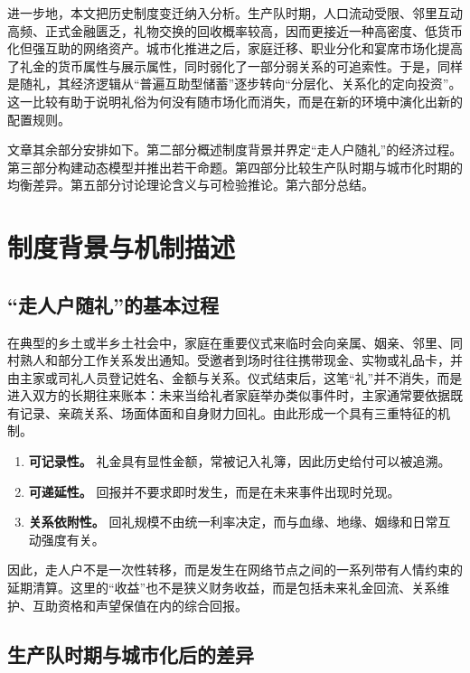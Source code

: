 \documentclass[12pt,a4paper]{ctexart}
\begin{document}
进一步地，本文把历史制度变迁纳入分析。生产队时期，人口流动受限、邻里互动高频、正式金融匮乏，礼物交换的回收概率较高，因而更接近一种高密度、低货币化但强互助的网络资产。城市化推进之后，家庭迁移、职业分化和宴席市场化提高了礼金的货币属性与展示属性，同时弱化了一部分弱关系的可追索性。于是，同样是随礼，其经济逻辑从“普遍互助型储蓄”逐步转向“分层化、关系化的定向投资”。这一比较有助于说明礼俗为何没有随市场化而消失，而是在新的环境中演化出新的配置规则。

文章其余部分安排如下。第二部分概述制度背景并界定“走人户随礼”的经济过程。第三部分构建动态模型并推出若干命题。第四部分比较生产队时期与城市化时期的均衡差异。第五部分讨论理论含义与可检验推论。第六部分总结。

\section{制度背景与机制描述}

\subsection{“走人户随礼”的基本过程}

在典型的乡土或半乡土社会中，家庭在重要仪式来临时会向亲属、姻亲、邻里、同村熟人和部分工作关系发出通知。受邀者到场时往往携带现金、实物或礼品卡，并由主家或司礼人员登记姓名、金额与关系。仪式结束后，这笔“礼”并不消失，而是进入双方的长期往来账本：未来当给礼者家庭举办类似事件时，主家通常要依据既有记录、亲疏关系、场面体面和自身财力回礼。由此形成一个具有三重特征的机制。

\begin{enumerate}[label=(\arabic*)]
\item \textbf{可记录性。} 礼金具有显性金额，常被记入礼簿，因此历史给付可以被追溯。
\item \textbf{可递延性。} 回报并不要求即时发生，而是在未来事件出现时兑现。
\item \textbf{关系依附性。} 回礼规模不由统一利率决定，而与血缘、地缘、姻缘和日常互动强度有关。
\end{enumerate}

因此，走人户不是一次性转移，而是发生在网络节点之间的一系列带有人情约束的延期清算。这里的“收益”也不是狭义财务收益，而是包括未来礼金回流、关系维护、互助资格和声望保值在内的综合回报。

\subsection{生产队时期与城市化后的差异}
\end{document}

